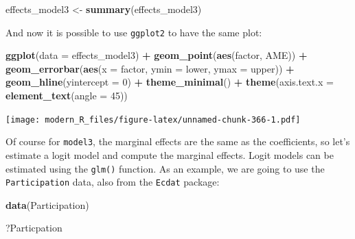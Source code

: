 \documentclass[]{gitbook}
\newenvironment{Shaded}{\begin{snugshade}}{\end{snugshade}}
\newcommand{\DataTypeTok}[1]{\textcolor[rgb]{0.13,0.29,0.53}{#1}}
\newcommand{\DecValTok}[1]{\textcolor[rgb]{0.00,0.00,0.81}{#1}}
\newcommand{\KeywordTok}[1]{\textcolor[rgb]{0.13,0.29,0.53}{\textbf{#1}}}
\newcommand{\NormalTok}[1]{#1}
\newcommand{\OperatorTok}[1]{\textcolor[rgb]{0.81,0.36,0.00}{\textbf{#1}}}
\newcommand{\StringTok}[1]{\textcolor[rgb]{0.31,0.60,0.02}{#1}}
\theoremstyle{definition}
\theoremstyle{definition}
\theoremstyle{definition}
\theoremstyle{remark}
\begin{document}
\begin{Shaded}
\begin{Highlighting}[]
\NormalTok{effects_model3 <-}\StringTok{ }\KeywordTok{summary}\NormalTok{(effects_model3)}
\end{Highlighting}
\end{Shaded}

And now it is possible to use \texttt{ggplot2} to have the same plot:

\begin{Shaded}
\begin{Highlighting}[]
\KeywordTok{ggplot}\NormalTok{(}\DataTypeTok{data =}\NormalTok{ effects_model3) }\OperatorTok{+}
\StringTok{  }\KeywordTok{geom_point}\NormalTok{(}\KeywordTok{aes}\NormalTok{(factor, AME)) }\OperatorTok{+}
\StringTok{  }\KeywordTok{geom_errorbar}\NormalTok{(}\KeywordTok{aes}\NormalTok{(}\DataTypeTok{x =}\NormalTok{ factor, }\DataTypeTok{ymin =}\NormalTok{ lower, }\DataTypeTok{ymax =}\NormalTok{ upper)) }\OperatorTok{+}
\StringTok{  }\KeywordTok{geom_hline}\NormalTok{(}\DataTypeTok{yintercept =} \DecValTok{0}\NormalTok{) }\OperatorTok{+}
\StringTok{  }\KeywordTok{theme_minimal}\NormalTok{() }\OperatorTok{+}
\StringTok{  }\KeywordTok{theme}\NormalTok{(}\DataTypeTok{axis.text.x =} \KeywordTok{element_text}\NormalTok{(}\DataTypeTok{angle =} \DecValTok{45}\NormalTok{))}
\end{Highlighting}
\end{Shaded}

\texttt{[image: modern\_R\_files/figure-latex/unnamed-chunk-366-1.pdf]}

Of course for \texttt{model3}, the marginal effects are the same as the
coefficients, so let's estimate a logit model and compute the marginal
effects. Logit models can be estimated using the \texttt{glm()}
function. As an example, we are going to use the \texttt{Participation}
data, also from the \texttt{Ecdat} package:

\begin{Shaded}
\begin{Highlighting}[]
\KeywordTok{data}\NormalTok{(Participation)}
\end{Highlighting}
\end{Shaded}

\begin{Shaded}
\begin{Highlighting}[]
\NormalTok{?Particpation}
\end{Highlighting}
\end{Shaded}
\end{document}
